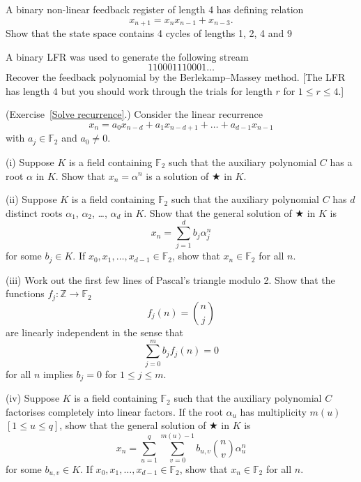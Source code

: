 \begin{question}\label{C4.2}
A binary non-linear feedback register of length 4
has defining relation
\[x_{n+1}=x_{n}x_{n-1}+x_{n-3}.\]
Show that the state space contains 4 cycles of lengths
1, 2, 4 and 9
\end{question}
\begin{question}\label{C4.3}
A binary LFR was used to generate
the following stream
\[110001110001\dots\]
Recover the feedback polynomial by the Berlekamp--Massey
method. [The  LFR has length $4$ but you should work through
the trials for length $r$ for $1\leq r\leq 4$.]
\end{question}
\begin{question}\label{C4.4}
(Exercise~\ref{Solve recurrence}.)
Consider the linear recurrence
\begin{equation*}
x_{n}=a_{0}x_{n-d}+a_{1}x_{n-d+1}+\ldots+a_{d-1}x_{n-1}\tag*{$\bigstar$}
\end{equation*}
with $a_{j}\in {\mathbb F}_{2}$ and $a_{0}\neq 0$.

(i) Suppose $K$ is a field containing ${\mathbb F}_{2}$
such that the auxiliary polynomial $C$ has a root $\alpha$
in $K$. Show that $x_{n}=\alpha^{n}$ is a solution of $\bigstar$ in $K$.

(ii) Suppose $K$ is a field containing ${\mathbb F}_{2}$
such that the auxiliary polynomial $C$ has
$d$ distinct roots $\alpha_{1}$, $\alpha_{2}$,
\dots, $\alpha_{d}$ in $K$. Show that the general solution
of $\bigstar$ in $K$ is
\[x_{n}=\sum_{j=1}^{d}b_{j}\alpha_{j}^{n}\]
for some $b_{j}\in K$.
If $x_{0},x_{1},\dots,x_{d-1}\in {\mathbb F}_{2}$,
show that $x_{n}\in {\mathbb F}_{2}$ for all $n$.

(iii) Work out the first few lines of Pascal's triangle
modulo 2. Show that the functions
$f_{j}:{\mathbb Z}\rightarrow{\mathbb F}_{2}$
\[f_{j}(n)=\binom{n}{j}\]
are linearly independent in the sense that
\[\sum_{j=0}^{m}b_{j}f_{j}(n)=0\]
for all $n$ implies $b_{j}=0$ for $1\leq j\leq m$.

(iv) Suppose $K$ is a field containing ${\mathbb F}_{2}$
such that the auxiliary polynomial $C$ factorises
completely into linear factors. If the
root $\alpha_{u}$ has multiplicity $m(u)$ $[1\leq u\leq q]$,
show that the general solution
of $\bigstar$ in $K$ is
\[x_{n}=\sum_{u=1}^{q}\sum_{v=0}^{m(u)-1}
b_{u,v}\binom{n}{v}\alpha_{u}^{n}\]
for some $b_{u,v}\in K$.
If $x_{0},x_{1},\dots,x_{d-1}\in {\mathbb F}_{2}$,
show that $x_{n}\in {\mathbb F}_{2}$ for all $n$.
\end{question}
